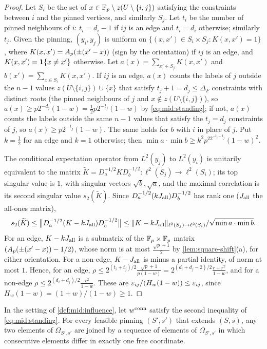 \begin{proof}
Let $S_i$ be the set of $x\in\mathbb F_p\setminus z(U\setminus\{i,j\})$ satisfying the
constraints between $i$ and the pinned vertices, and similarly $S_j$. Let $t_i$
be the number of pinned neighbours of $i$: $t_i=d_i-1$ if $ij$ is an edge and
$t_i=d_i$ otherwise; similarly $t_j$. Given the pinning, $(y_i,y_j)$ is uniform
on $\{(x,x')\in S_i\times S_j:K(x,x')=1\}$, where $K(x,x')=A_{p}(\pm(x'-x))$ (sign
by the orientation) if $ij$ is an edge, and $K(x,x')=\mathbf 1\{x\ne x'\}$
otherwise. Let $a(x)=\sum_{x'\in S_j}K(x,x')$ and $b(x')=\sum_{x\in
S_i}K(x,x')$. If $ij$ is an edge, $a(x)$ counts the labels of $j$ outside the
$n-1$ values $z(U\setminus\{i,j\})\cup\{x\}$ that satisfy $t_j+1=d_j\le\Delta_F$
constraints with distinct roots (the pinned neighbours of $j$ and
$x\notin z(U\setminus\{i,j\})$), so $a(x)\ge p2^{-d_j}(1-w)=\frac12p2^{-t_j}(1-w)$
by \eqref{eq:mid:standing}; if not, $a(x)$ counts the labels outside the same
$n-1$ values that satisfy the $t_j=d_j$ constraints of $j$, so
$a(x)\ge p2^{-t_j}(1-w)$. The same holds for $b$ with $i$ in place of $j$. Put
$k=\frac12$ for an edge and $k=1$ otherwise; then
$\min a\cdot\min b\ge k^2p^22^{-t_i-t_j}(1-w)^2$.

The conditional expectation operator from $L^2(y_j)$ to $L^2(y_i)$ is unitarily
equivalent to the matrix $\widetilde K=D_a^{-1/2}KD_b^{-1/2}\colon\ell^2(S_j)\to
\ell^2(S_i)$; its top singular value is $1$, with singular vectors
$\sqrt b,\sqrt a$, and the maximal correlation is its second singular value
$s_2(\widetilde K)$. Since $D_a^{-1/2}(kJ_{\mathrm{all}})D_b^{-1/2}$ has rank one ($J_{\mathrm{all}}$
the all-ones matrix),
\[
  s_2(\widetilde K)\le\big\|D_a^{-1/2}(K-kJ_{\mathrm{all}})D_b^{-1/2}\big\|\le
  \|K-kJ_{\mathrm{all}}\|_{\ell^2(S_j)\to\ell^2(S_i)}/\sqrt{\min a\cdot\min b} .
\]
For an edge, $K-kJ_{\mathrm{all}}$ is a submatrix of the $\mathbb F_p\times\mathbb F_p$ matrix
$(A_{p}(\pm(x'-x))-1/2)$, whose norm is at most $\frac{\sqrt p+1}2$ by
\cref{lem:square-shift}(a), for either orientation. For a non-edge,
$K-J_{\mathrm{all}}$ is minus a partial identity, of norm at most $1$. Hence, for an edge,
$\rho\le2^{(t_i+t_j)/2}\frac{\sqrt p+1}{p(1-w)}=2^{(d_i+d_j-2)/2}\frac{r+r^2}{1-w}$,
and for a non-edge $\rho\le2^{(d_i+d_j)/2}\frac{r^2}{1-w}$. These are
$\varepsilon_{ij}/(H_w(1-w))\le\varepsilon_{ij}$, since $H_w(1-w)=(1+w)/(1-w)\ge1$.
\end{proof}

\begin{lemma}\label{lem:mid:connect}
In the setting of \cref{def:mid:influence}, let $w^{\rm conn}$ satisfy the
second inequality of \eqref{eq:mid:standing}. For every feasible pinning
$(S',s')$ that extends $(S,s)$, any two elements of $\Omega_{S',s'}$ are joined
by a sequence of elements of $\Omega_{S',s'}$ in which consecutive elements
differ in exactly one free coordinate.
\end{lemma}

